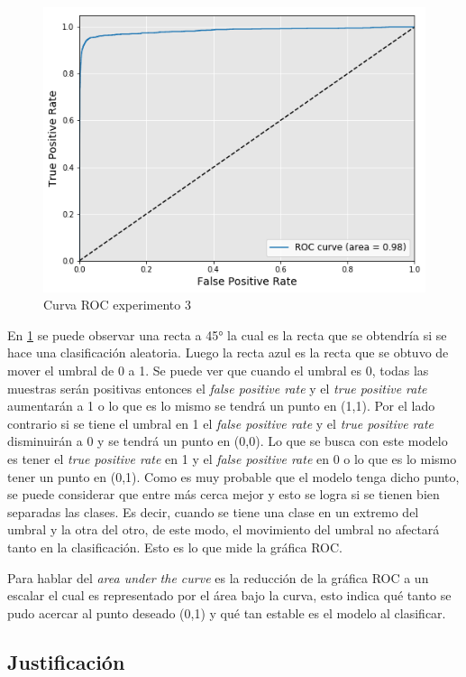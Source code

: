 \begin{figure}[H]
	\centering
	\includegraphics[width=0.8\linewidth]{imagenes/ROC_Exp3_1.png}
	\caption{Curva ROC experimento 3}
	\label{fig:ROCMuestra}
\end{figure}

\par En \ref{fig:ROCMuestra} se puede observar una recta a \ang{45} la cual es la recta que se obtendría si se hace una clasificación aleatoria. Luego la recta azul es la recta que se obtuvo de mover el umbral de 0 a 1. Se puede ver que cuando el umbral es 0, todas las muestras serán positivas entonces el \textit{false positive rate} y el  \textit{true positive rate} aumentarán a 1 o lo que es lo mismo se tendrá un punto en (1,1). Por el lado contrario si se tiene el umbral en 1 el \textit{false positive rate} y el  \textit{true positive rate} disminuirán a 0 y se tendrá un punto en (0,0). Lo que se busca con este modelo es tener el \textit{true positive rate} en 1 y el \textit{false positive rate} en 0 o lo que es lo mismo tener un punto en (0,1). Como es muy probable que el modelo tenga dicho punto, se puede considerar que entre más cerca mejor y esto se logra si se tienen bien separadas las clases. Es decir, cuando se tiene una clase en un extremo del umbral y la otra del otro, de este modo, el movimiento del umbral no afectará tanto en la clasificación. Esto es lo que mide la gráfica ROC.

\par Para hablar del \textit{area under the curve} es la reducción de la gráfica ROC a un escalar el cual es representado por el área bajo la curva, esto indica qué tanto se pudo acercar al punto deseado (0,1) y qué tan estable es el modelo al clasificar.

\subsection{Justificación}

